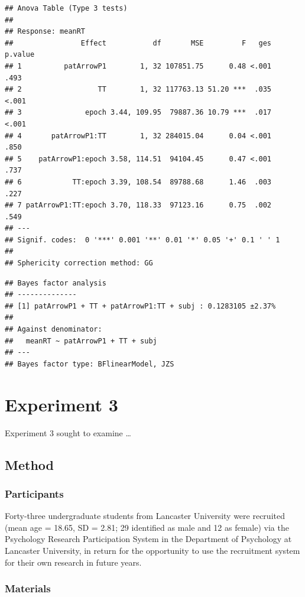 \documentclass[
  man]{apa6}
\begin{document}
\begin{verbatim}
## Anova Table (Type 3 tests)
## 
## Response: meanRT
##                Effect           df       MSE         F   ges p.value
## 1          patArrowP1        1, 32 107851.75      0.48 <.001    .493
## 2                  TT        1, 32 117763.13 51.20 ***  .035   <.001
## 3               epoch 3.44, 109.95  79887.36 10.79 ***  .017   <.001
## 4       patArrowP1:TT        1, 32 284015.04      0.04 <.001    .850
## 5    patArrowP1:epoch 3.58, 114.51  94104.45      0.47 <.001    .737
## 6            TT:epoch 3.39, 108.54  89788.68      1.46  .003    .227
## 7 patArrowP1:TT:epoch 3.70, 118.33  97123.16      0.75  .002    .549
## ---
## Signif. codes:  0 '***' 0.001 '**' 0.01 '*' 0.05 '+' 0.1 ' ' 1
## 
## Sphericity correction method: GG
\end{verbatim}

\begin{verbatim}
## Bayes factor analysis
## --------------
## [1] patArrowP1 + TT + patArrowP1:TT + subj : 0.1283105 ±2.37%
## 
## Against denominator:
##   meanRT ~ patArrowP1 + TT + subj 
## ---
## Bayes factor type: BFlinearModel, JZS
\end{verbatim}

\hypertarget{experiment-3}{%
\section{Experiment 3}\label{experiment-3}}

Experiment 3 sought to examine \ldots{}

\hypertarget{method-2}{%
\subsection{Method}\label{method-2}}

\hypertarget{participants-2}{%
\subsubsection{Participants}\label{participants-2}}

Forty-three undergraduate students from Lancaster University were recruited (mean age = 18.65, SD = 2.81; 29 identified as male and 12 as female) via the Psychology Research Participation System in the Department of Psychology at Lancaster University, in return for the opportunity to use the recruitment system for their own research in future years.

\hypertarget{materials-2}{%
\subsubsection{Materials}\label{materials-2}}
\end{document}
